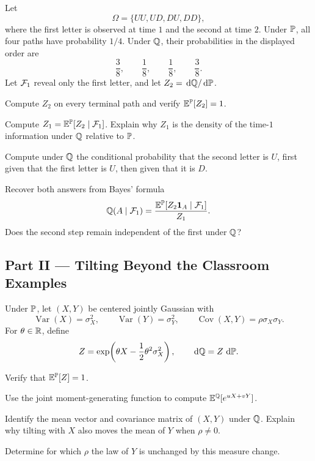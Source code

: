 \begin{exercise}
Let
\[
\Omega=\{UU,UD,DU,DD\},
\]
where the first letter is observed at time \(1\) and the second at time \(2\).
Under \(\mathbb{P}\), all four paths have probability \(1/4\). Under \(\mathbb{Q}\), their
probabilities in the displayed order are
\[
\frac38,\qquad\frac18,\qquad\frac18,\qquad\frac38.
\]
Let \(\mathcal{F}_1\) reveal only the first letter, and let
\(Z_2=\,\mathrm{d}\mathbb{Q}/\,\mathrm{d}\mathbb{P}\).
\begin{exparts}
  \item Compute \(Z_2\) on every terminal path and verify
  \(\mathbb{E}^{\mathbb{P}}[Z_2]=1\).
  \item Compute \(Z_1=\mathbb{E}^{\mathbb{P}}[Z_2\mid\mathcal{F}_1]\). Explain why \(Z_1\) is the
  density of the time-\(1\) information under \(\mathbb{Q}\) relative to \(\mathbb{P}\).
  \item Compute under \(\mathbb{Q}\) the conditional probability that the second
  letter is \(U\), first given that the first letter is \(U\), then given
  that it is \(D\).
  \item Recover both answers from Bayes' formula
  \[
  \mathbb{Q}(A\mid\mathcal{F}_1)
  =\frac{\mathbb{E}^{\mathbb{P}}[Z_2\mathbf{1}_A\mid\mathcal{F}_1]}{Z_1}.
  \]
  Does the second step remain independent of the first under \(\mathbb{Q}\)?
\end{exparts}
\end{exercise}

\subsection*{Part II --- Tilting Beyond the Classroom Examples}

\begin{exercise}
Under \(\mathbb{P}\), let \((X,Y)\) be centered jointly Gaussian with
\[
\operatorname{Var}(X)=\sigma_X^2,\qquad
\operatorname{Var}(Y)=\sigma_Y^2,\qquad
\operatorname{Cov}(X,Y)=\rho\sigma_X\sigma_Y.
\]
For \(\theta\in\mathbb{R}\), define
\[
Z=\exp\!\left(\theta X-\frac12\theta^2\sigma_X^2\right),
\qquad \,\mathrm{d}\mathbb{Q}=Z\,\,\mathrm{d}\mathbb{P}.
\]
\begin{exparts}
  \item Verify that \(\mathbb{E}^{\mathbb{P}}[Z]=1\).
  \item Use the joint moment-generating function to compute
  \(\mathbb{E}^{\mathbb{Q}}[e^{uX+vY}]\).
  \item Identify the mean vector and covariance matrix of \((X,Y)\) under
  \(\mathbb{Q}\). Explain why tilting with \(X\) also moves the mean of \(Y\)
  when \(\rho\neq0\).
  \item Determine for which \(\rho\) the law of \(Y\) is unchanged by this
  measure change.
\end{exparts}
\end{exercise}

